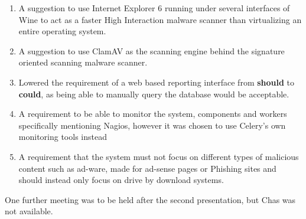 \begin{enumerate} 
    \item A suggestion to use Internet Explorer 6 running under
            several interfaces of Wine to act as a faster High Interaction
            malware scanner than virtualizing an entire operating system.

    \item A suggestion to use ClamAV as the scanning engine behind the signature
        oriented scanning malware scanner.

    \item Lowered the requirement of a web based reporting interface from
        \textbf{should} to \textbf{could}, as being able to manually query the
        database would be acceptable.

    \item A requirement to be able to monitor the system, components and workers
        specifically mentioning Nagios, however it was chosen to use Celery's
        own monitoring tools instead

    \item A requirement that the system must not focus on different types of
        malicious content such as ad-ware, made for ad-sense pages or Phishing
        sites and should instead only focus on drive by download systems.
\end{enumerate}

One further meeting was to be held after the second presentation, but Chas was
not available.

